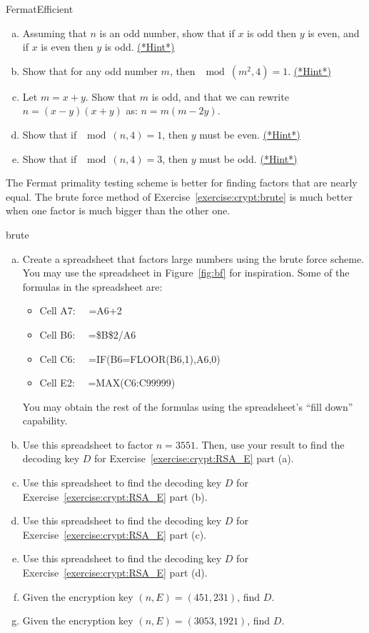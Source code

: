 \begin{exercise}{FermatEfficient}
\begin{enumerate}[(a)]
\item
Assuming that $n$ is an odd number, show that if $x$ is odd then $y$ is even, and if $x$ is even then $y$ is odd.
\hyperref[sec:crypt:hints]{(*Hint*)}
\item
Show that for any odd number $m$, then $\mod(m^2,4) = 1$.
\hyperref[sec:crypt:hints]{(*Hint*)}
\item
Let $m = x + y$. Show that $m$ is odd, and that we can rewrite  $n  = (x-y)(x+y)$ as: $n = m(m-2y)$. 
\item
Show that if $\mod(n,4)=1$, then $y$ must be even.
\hyperref[sec:crypt:hints]{(*Hint*)}
\item
Show that if $\mod(n,4)=3$, then $y$ must be odd.
\hyperref[sec:crypt:hints]{(*Hint*)}
\end{enumerate}
\end{exercise}

The Fermat primality testing scheme is better for finding factors that are nearly equal. The brute force method of Exercise~\ref{exercise:crypt:brute}  is much better when one factor is much bigger than the other one.

\begin{exercise}{brute}
\begin{enumerate}[(a)]
\item
Create a spreadsheet that factors large numbers using the brute force scheme. You may use the spreadsheet in Figure~\ref{fig:bf} for inspiration. Some of the formulas in the spreadsheet are:
\begin{itemize}
\item
Cell A7: ~~=A6+2
\item
Cell B6:  ~~=\$B\$2/A6
\item
Cell C6:  ~~=IF(B6=FLOOR(B6,1),A6,0)
\item
Cell E2: ~~=MAX(C6:C99999)
\end{itemize}
You may obtain the rest of the formulas using the spreadsheet's ``fill down'' capability.
\item
Use this spreadsheet to factor $n=3551$. Then, use your result to find the decoding key $D$ for Exercise~\ref{exercise:crypt:RSA_E} part (a).
\item
Use this spreadsheet to  find the decoding key $D$ for Exercise~\ref{exercise:crypt:RSA_E} part (b).
\item
Use this spreadsheet to  find the decoding key $D$ for Exercise~\ref{exercise:crypt:RSA_E} part (c).
\item
Use this spreadsheet to  find the decoding key $D$ for Exercise~\ref{exercise:crypt:RSA_E} part (d).
\item
Given the encryption key $(n,E) = (451,231)$, find $D$.
\item
Given the encryption key $(n,E) = (3053,1921)$, find $D$.
\end{enumerate}
\end{exercise}

